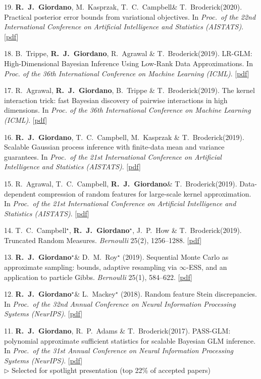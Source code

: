 \documentclass[margin,line]{res}
\newcommand{\me}{\textbf{R.~J.~Giordano}\xspace}
\newcommand{\mestar}{\textbf{R.~J.~Giordano}$^{\star}$\xspace}
\newcommand{\trevor}{T.~C.~Campbell\xspace}
\newcommand{\trevorstar}{T.~C.~Campbell$^{\star}$\xspace}
\newcommand{\tamara}{T.~Broderick\xspace}
\newcommand{\paperref}[1]{[\href{#1}{pdf}]}
\newcommand{\paperref}[1]{}
\begin{document}
\begin{resume}
19. \me, M.~Kasprzak, \trevor \& \tamara (2020).
Practical posterior error bounds from variational objectives.
In \emph{Proc.~of the 22nd International Conference on Artificial Intelligence and Statistics (AISTATS)}.
\paperref{https://arxiv.org/abs/1910.04102}

18. B.~Trippe, \me, R.~Agrawal \& \tamara (2019).
LR-GLM: High-Dimensional Bayesian Inference Using Low-Rank Data Approximations.
In \emph{Proc. of the 36th International Conference on Machine Learning (ICML)}.
\paperref{https://arxiv.org/abs/1905.07499}

17.  R.~Agrawal, \me, B.~Trippe \& \tamara (2019).
The kernel interaction trick: fast Bayesian discovery of pairwise interactions in high dimensions.
In \emph{Proc. of the 36th International Conference on Machine Learning (ICML)}.
\paperref{https://arxiv.org/pdf/1905.06501}

16. \me, \trevor, M.~Kasprzak \& \tamara (2019).
Scalable Gaussian process inference with finite-data mean and variance guarantees.
In \emph{Proc.~of the 21st International Conference on Artificial Intelligence and Statistics (AISTATS)}.
\paperref{https://arxiv.org/abs/1806.10234}

15. R.~Agrawal, \trevor, \me \& \tamara (2019).
Data-dependent compression of random features for large-scale kernel approximation.
In \emph{Proc.~of the 21st International Conference on Artificial Intelligence and Statistics (AISTATS)}.
\paperref{https://arxiv.org/abs/1810.04249}

14. \trevorstar, \mestar, J.~P.~How \& \tamara (2019).
Truncated Random Measures.
\emph{Bernoulli} 25(2), 1256--1288.
\paperref{http://arxiv.org/abs/1603.00861}

13.  \mestar \& D.~M.~Roy$^{\star}$ (2019).
Sequential Monte Carlo as approximate sampling: bounds, adaptive resampling via $\infty$-ESS, and an application to particle Gibbs.
\emph{Bernoulli} 25(1), 584--622.
\paperref{http://arxiv.org/abs/1503.00966}

12. \mestar \& L.~Mackey$^{\star}$ (2018).
Random feature Stein discrepancies.
In \emph{Proc.\ of the 32nd Annual Conference on Neural Information Processing Systems (NeurIPS)}.
\paperref{https://arxiv.org/abs/1806.07788}

11. \me, R.~P.~Adams \& \tamara (2017).
PASS-GLM: polynomial approximate sufficient statistics for scalable Bayesian GLM inference.
In \emph{Proc.\ of the 31st Annual Conference on Neural Information Processing Systems (NeurIPS)}.
\paperref{http://arxiv.org/abs/1709.09216} \\
\quad$\rhd$ Selected for spotlight presentation (top 22\% of accepted papers)


\end{resume}
\end{document}

